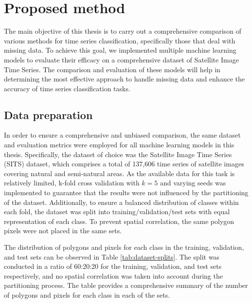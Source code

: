 \chapter{Proposed method}


The main objective of this thesis is to carry out a comprehensive comparison of various methods for time series classification, specifically those that deal with missing data.
To achieve this goal, we implemented multiple machine learning models to evaluate their efficacy on a comprehensive dataset of Satellite Image Time Series.
The comparison and evaluation of these models will help in determining the most effective approach to handle missing data and enhance the accuracy of time series classification tasks.


\section{Data preparation}

In order to ensure a comprehensive and unbiased comparison, the same dataset and evaluation metrics were employed for all machine learning models in this thesis. 
Specifically, the dataset of choice was the Satellite Image Time Series (SITS) dataset, which comprises a total of 137,606 time series of satellite images covering natural and semi-natural areas. 
As the available data for this task is relatively limited, k-fold cross validation with $k=5$ and varying seeds was implemented to guarantee that the results were not influenced by the partitioning of the dataset. Additionally, to ensure a balanced distribution of classes within each fold, the dataset was split into training/validation/test sets with equal representation of each class. 
To prevent spatial correlation, the same polygon pixels were not placed in the same sets.

The distribution of polygons and pixels for each class in the training, validation, and test sets can be observed in Table \ref{tab:dataset-splits}.
The split was conducted in a ratio of 60:20:20 for the training, validation, and test sets respectively, and no spatial correlation was taken into account during the partitioning process.
The table provides a comprehensive summary of the number of polygons and pixels for each class in each of the sets.


